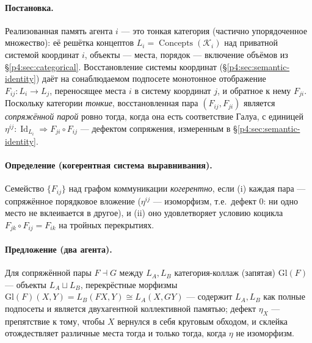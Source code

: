 \documentclass{article}
\begin{document}
\paragraph{Постановка.} Реализованная память агента $i$ --- это тонкая
категория (частично упорядоченное множество): её решётка концептов
$L_i=\operatorname{Concepts}(\mathcal{K}_i)$ над приватной системой координат
$i$, объекты --- места, порядок --- включение объёмов из
\S\ref{p4:sec:categorical}. Восстановление системы координат
(\S\ref{p4:sec:semantic-identity}) даёт на сонаблюдаемом подпосете монотонное
отображение $F_{ij}:L_i\to L_j$, переносящее места $i$ в систему координат
$j$, и обратное к нему $F_{ji}$. Поскольку категории \emph{тонкие},
восстановленная пара $(F_{ij},F_{ji})$ является \emph{сопряжённой парой} ровно
тогда, когда она есть соответствие Галуа, с единицей
$\eta^{ij}:\operatorname{Id}_{L_i}\Rightarrow F_{ji}\!\circ\!F_{ij}$ ---
дефектом сопряжения, измеренным в \S\ref{p4:sec:semantic-identity}.

\paragraph{Определение (когерентная система выравнивания).} Семейство
$\{F_{ij}\}$ над графом коммуникации \emph{когерентно}, если (i) каждая пара
--- сопряжённое порядковое вложение ($\eta^{ij}$ --- изоморфизм, т.е.\ дефект
$0$: ни одно место не вклеивается в другое), и (ii) оно удовлетворяет условию
коцикла $F_{jk}\!\circ\!F_{ij}=F_{ik}$ на тройных перекрытиях.

\paragraph{Предложение (два агента).} Для сопряжённой пары $F\dashv G$ между
$L_A,L_B$ категория-коллаж (запятая) $\mathrm{Gl}(F)$ --- объекты
$L_A\sqcup L_B$, перекрёстные морфизмы $\mathrm{Gl}(F)(X,Y)=L_B(FX,Y)\cong L_A(X,GY)$
\citep{maclane1998categories} --- содержит $L_A,L_B$ как полные подпосеты и
является двухагентной коллективной памятью; дефект $\eta_X$ --- препятствие к
тому, чтобы $X$ вернулся в себя круговым обходом, и склейка отождествляет
различные места тогда и только тогда, когда $\eta$ не изоморфизм.
\end{document}
